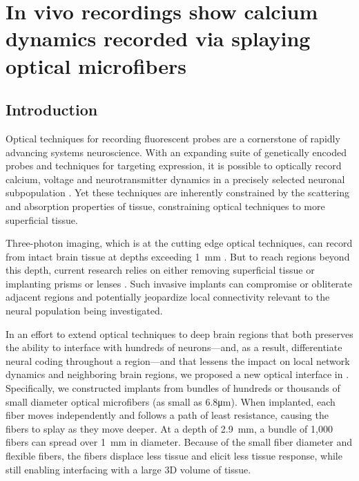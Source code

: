 \chapter{In vivo recordings show calcium dynamics recorded via splaying optical microfibers}

\label{chapter:recording}
\thispagestyle{myheadings}

\graphicspath{{5_Recording/Figures/}}


\section{Introduction}

Optical techniques for recording fluorescent probes are a cornerstone 
of rapidly advancing systems neuroscience. With an expanding suite of 
genetically encoded probes and techniques for targeting expression, it
 is possible to optically record calcium, voltage and neurotransmitter
 dynamics in a precisely selected neuronal subpopulation 
\cite{Emiliani:2015jl,Gong:2015is}. Yet these techniques are 
inherently constrained by the scattering and absorption properties of 
tissue, constraining optical techniques to more superficial tissue.



Three-photon imaging, which is at the cutting edge optical techniques,
 can record from intact brain tissue at depths exceeding 
1~\si{\milli\meter} \cite{Horton:2013gxa,Wang:2017jp}. But to reach 
regions beyond this depth, current research relies on either removing 
superficial tissue \cite{Dombeck:2010jr} or implanting prisms or 
lenses \cite{Jung:2004kv,Barretto:2009hk,Andermann:2013kc,Cui:2013dq}.
 Such invasive implants can compromise or obliterate adjacent regions 
and potentially jeopardize local connectivity relevant to the neural 
population being investigated.



In an effort to extend optical techniques to deep brain regions that 
both preserves the ability to interface with hundreds of 
neurons---and, as a result, differentiate neural coding throughout a 
region---and that lessens the impact on local network dynamics and 
neighboring brain regions, we proposed a new optical interface in 
\cite{Perkins:2018ae}. Specifically, we constructed implants from 
bundles of hundreds or thousands of small diameter optical microfibers
 (as small as 6.8\si{\micro\meter}). When implanted, each fiber moves 
independently and follows a path of least resistance, causing the 
fibers to splay as they move deeper. At a depth of 
2.9~\si{\milli\meter}, a bundle of 1,000 fibers can spread over 
1~\si{\milli\meter} in diameter. Because of the small fiber diameter 
and flexible fibers, the fibers displace less tissue and elicit less 
tissue response, while still enabling interfacing with a large 3D 
volume of tissue.



